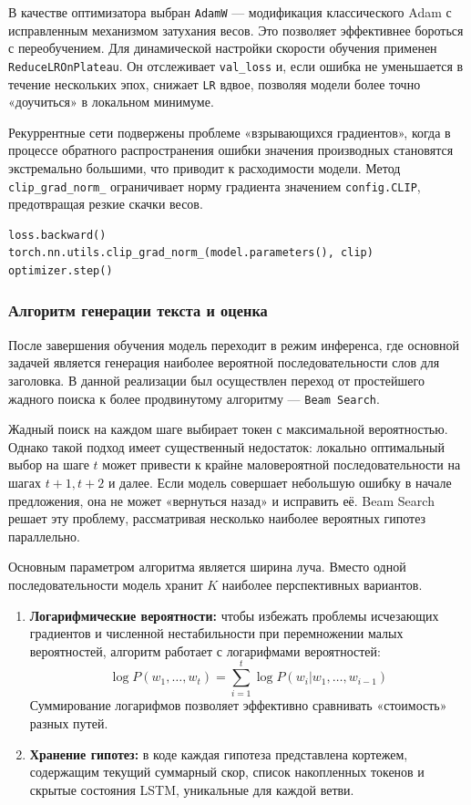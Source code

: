 \documentclass[coursework]{SCWorks}
\begin{document}
    В качестве оптимизатора выбран \texttt{AdamW} — модификация классического Adam
    с исправленным механизмом затухания весов.
    Это позволяет эффективнее бороться с переобучением.
    Для динамической настройки скорости обучения применен \texttt{ReduceLROnPlateau}.
    Он отслеживает \texttt{val\_loss} и, если ошибка не уменьшается в течение нескольких эпох,
    снижает \texttt{LR} вдвое, позволяя модели более точно «доучиться» в локальном минимуме.

    Рекуррентные сети подвержены проблеме «взрывающихся градиентов»,
    когда в процессе обратного распространения ошибки значения производных становятся экстремально большими,
    что приводит к расходимости модели.
    Метод \texttt{clip\_grad\_norm\_} ограничивает норму градиента значением \texttt{config.CLIP},
    предотвращая резкие скачки весов.

    \begin{verbatim}
loss.backward()
torch.nn.utils.clip_grad_norm_(model.parameters(), clip)
optimizer.step()
    \end{verbatim}

    \subsubsection{Алгоритм генерации текста и оценка}

    После завершения обучения модель переходит в режим инференса,
    где основной задачей является генерация наиболее вероятной последовательности слов для заголовка.
    В данной реализации был осуществлен переход от простейшего жадного поиска к более продвинутому алгоритму
    --- \texttt{Beam Search}.

    Жадный поиск на каждом шаге выбирает токен с максимальной вероятностью.
    Однако такой подход имеет существенный недостаток: локально оптимальный выбор на шаге $t$
    может привести к крайне маловероятной последовательности на шагах $t+1, t+2$ и далее.
    Если модель совершает небольшую ошибку в начале предложения, она не может «вернуться назад» и исправить её.
    Beam Search решает эту проблему, рассматривая несколько наиболее вероятных гипотез параллельно.

    Основным параметром алгоритма является ширина луча.
    Вместо одной последовательности модель хранит $K$ наиболее перспективных вариантов.

    \begin{enumerate}
        \item \textbf{Логарифмические вероятности:} чтобы избежать проблемы исчезающих градиентов и численной нестабильности при перемножении малых вероятностей, алгоритм работает с логарифмами вероятностей:
        \[ \log P(w_1, \dots, w_t) = \sum_{i=1}^{t} \log P(w_i | w_1, \dots, w_{i-1}) \]
        Суммирование логарифмов позволяет эффективно сравнивать «стоимость» разных путей.

        \item \textbf{Хранение гипотез:} в коде каждая гипотеза представлена кортежем, содержащим текущий суммарный скор, список накопленных токенов и скрытые состояния LSTM, уникальные для каждой ветви.
    \end{enumerate}
\end{document}
